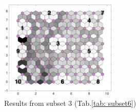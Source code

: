 \begin{figure}
        \centering
        \includegraphics[width=0.5\textwidth]{../../images0.01/M31/2D/image_subsets/subset6_dist_with_hits_t.png}
    \caption{Results from subset 3 (Tab.\ref{tab: subset6})}
    \label{fig: subset6}
\end{figure}